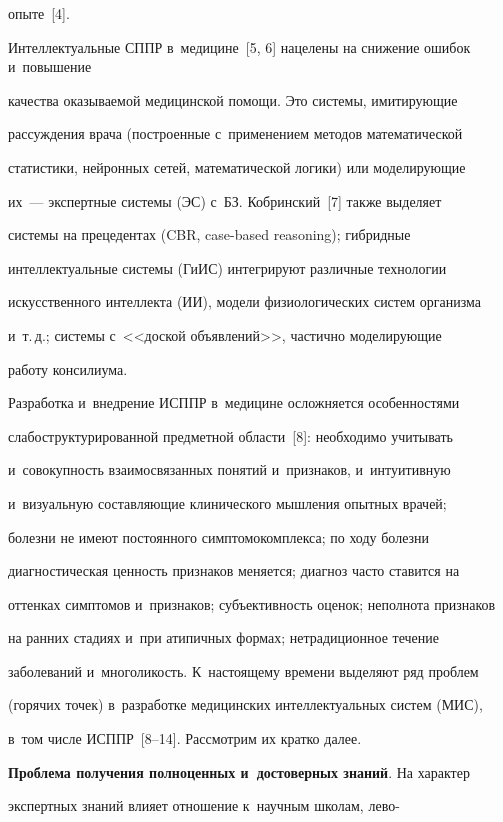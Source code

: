 опыте~[4]. 

  

  Интеллектуальные СППР в~медицине~[5, 6] нацелены на снижение ошибок и~повышение 

качества оказываемой медицинской помощи. Это сис\-те\-мы, имитирующие 

рас\-суж\-де\-ния врача (построенные с~применением методов математической 

статистики, нейронных сетей, математической логики) или моделирующие  

их~--- экспертные сис\-те\-мы (ЭС) с~БЗ. Кобринский~[7] также выделяет 

системы на прецедентах (CBR, case-based reasoning); гибридные 

интеллектуальные системы (ГиИС) интегрируют различные технологии 

искусственного интеллекта (ИИ), модели физиологических систем организма 

и~т.\,д.; сис\-те\-мы с~<<доской объявлений>>, частично моделирующие 

работу консилиума.

  

  Разработка и~внедрение ИСППР в~медицине осложняется особенностями 

слабоструктурированной предметной области~[8]: необходимо учитывать 

и~совокупность взаимосвязанных понятий и~признаков, и~интуитивную 

и~визуальную составляющие клинического мышления опытных врачей; 

болезни не имеют постоянного симптомокомплекса; по ходу болезни 

диагностическая цен\-ность признаков меняется; диагноз часто ставится на 

оттенках симптомов и~признаков; субъективность оценок; неполнота признаков 

на ранних стадиях и~при атипичных формах; нетрадиционное течение 

заболеваний и~многоликость. К~настоящему времени выделяют ряд проб\-лем 

(горячих точек) в~разработке медицинских интеллектуальных систем (МИС), 

в~том числе ИСППР~[8--14]. Рассмотрим их кратко далее.

  

  \textbf{Проблема получения полноценных и~достоверных знаний}. На характер 

экспертных знаний влияет отношение к~научным школам, лево- 

